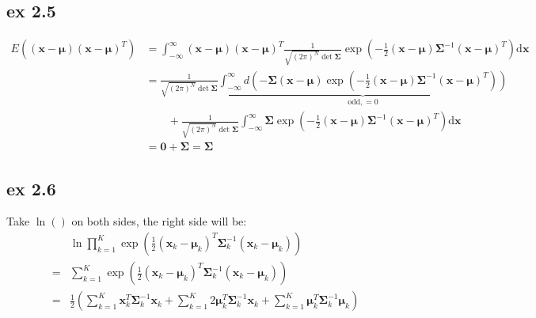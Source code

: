 \documentclass[10pt]{article}
\begin{document}
\subsection{ex 2.5}
\begin{equation}
\begin{split}
E\left( {\left( {\mathbf{x}-\boldsymbol{\mu}} \right){{\left( {\mathbf{x}-\boldsymbol{\mu}} \right)}^T}} \right) &= \int_{ - \infty }^\infty  {\left( {\mathbf{x}-\boldsymbol{\mu}} \right){{\left( {\mathbf{x}-\boldsymbol{\mu}} \right)}^T}\frac{1}{{\sqrt {(2\pi)^N } \det \boldsymbol{\Sigma} }}\exp \left( { - \frac{1}{2}\left( {\mathbf{x}-\boldsymbol{\mu}} \right){\boldsymbol{\Sigma} ^{ - 1}}{{\left( {\mathbf{x}-\boldsymbol{\mu}} \right)}^T}} \right)\mathrm{d}\mathbf{x}} \\
&= \frac{1}{{\sqrt {(2\pi)^N } \det \boldsymbol{\Sigma} }}\underbrace{\int_{ - \infty }^\infty d\left( { - \boldsymbol{\Sigma} \left( {\mathbf{x}-\boldsymbol{\mu}} \right)\exp \left( { - \frac{1}{2}\left( {\mathbf{x}-\boldsymbol{\mu}} \right){\boldsymbol{\Sigma} ^{ - 1}}{{\left( {\mathbf{x}-\boldsymbol{\mu}} \right)}^T}} \right)} \right)}_{\mathrm{odd, = 0}}  \\
& \quad \quad + \frac{1}{{\sqrt {(2\pi)^N } \det \boldsymbol{\Sigma} }}\int_{ - \infty }^\infty  {\boldsymbol{\Sigma} \exp \left( { - \frac{1}{2}\left( {\mathbf{x}-\boldsymbol{\mu}} \right){\boldsymbol{\Sigma} ^{ - 1}}{{\left( {\mathbf{x}-\boldsymbol{\mu}} \right)}^T}} \right)\mathrm{d}\mathbf{x}}  \\
&= \mathbf{0} + \boldsymbol{\Sigma}  = \boldsymbol{\Sigma} 
\end{split}
\end{equation}

\subsection{ex 2.6}
Take $\ln()$ on both sides, the right side will be:
\begin{equation}
\begin{split}
& \ln \prod\limits_{k = 1}^K {\exp \left( {\frac{1}{2}{{\left( {{\mathbf{x}_k} - {\boldsymbol{\mu} _k}} \right)}^T}\boldsymbol{\Sigma} _k^{ - 1}\left( {{\mathbf{x}_k} - {\boldsymbol{\mu} _k}} \right)} \right)} \\
=&\sum\limits_{k = 1}^K {\exp \left( {\frac{1}{2}{{\left( {{\mathbf{x}_k} - {\boldsymbol{\mu} _k}} \right)}^T}\boldsymbol{\Sigma} _k^{ - 1}\left( {{\mathbf{x}_k} - {\boldsymbol{\mu} _k}} \right)} \right)} \\
=&\frac{1}{2}\left( {\sum\limits_{k = 1}^K {\mathbf{x}_k^T\boldsymbol{\Sigma} _k^{ - 1}{\mathbf{x}_k}}  + \sum\limits_{k = 1}^K {2\boldsymbol{\mu} _k^T\boldsymbol{\Sigma} _k^{ - 1}{\mathbf{x}_k}}  + \sum\limits_{k = 1}^K {\boldsymbol{\mu} _k^T\boldsymbol{\Sigma} _k^{ - 1}{\boldsymbol{\mu} _k}} } \right)
\end{split}
\end{equation}
\end{document}
